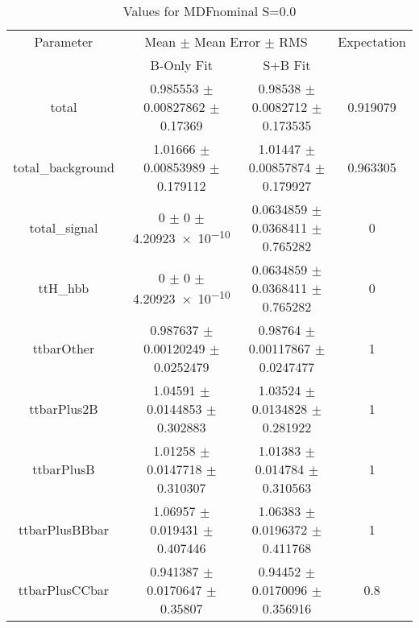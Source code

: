 \begin{table}
\centering
\caption{Values for MDFnominal S=0.0}
\begin{tabular}{cccc}
\toprule
Parameter & \multicolumn{2}{c}{Mean $\pm$ Mean Error $\pm$ RMS} & Expectation\\
 & B-Only Fit & S+B Fit & \\
\midrule
total & \num{0.985553} $\pm$ \num{0.00827862} $\pm$ \num{0.17369} & \num{0.98538} $\pm$ \num{0.0082712} $\pm$ \num{0.173535} & \num{0.919079}\\
total\_background & \num{1.01666} $\pm$ \num{0.00853989} $\pm$ \num{0.179112} & \num{1.01447} $\pm$ \num{0.00857874} $\pm$ \num{0.179927} & \num{0.963305}\\
total\_signal & \num{0} $\pm$ \num{0} $\pm$ \num{4.20923e-10} & \num{0.0634859} $\pm$ \num{0.0368411} $\pm$ \num{0.765282} & \num{0}\\
ttH\_hbb & \num{0} $\pm$ \num{0} $\pm$ \num{4.20923e-10} & \num{0.0634859} $\pm$ \num{0.0368411} $\pm$ \num{0.765282} & \num{0}\\
ttbarOther & \num{0.987637} $\pm$ \num{0.00120249} $\pm$ \num{0.0252479} & \num{0.98764} $\pm$ \num{0.00117867} $\pm$ \num{0.0247477} & \num{1}\\
ttbarPlus2B & \num{1.04591} $\pm$ \num{0.0144853} $\pm$ \num{0.302883} & \num{1.03524} $\pm$ \num{0.0134828} $\pm$ \num{0.281922} & \num{1}\\
ttbarPlusB & \num{1.01258} $\pm$ \num{0.0147718} $\pm$ \num{0.310307} & \num{1.01383} $\pm$ \num{0.014784} $\pm$ \num{0.310563} & \num{1}\\
ttbarPlusBBbar & \num{1.06957} $\pm$ \num{0.019431} $\pm$ \num{0.407446} & \num{1.06383} $\pm$ \num{0.0196372} $\pm$ \num{0.411768} & \num{1}\\
ttbarPlusCCbar & \num{0.941387} $\pm$ \num{0.0170647} $\pm$ \num{0.35807} & \num{0.94452} $\pm$ \num{0.0170096} $\pm$ \num{0.356916} & \num{0.8}\\
\bottomrule
\end{tabular}
\end{table}